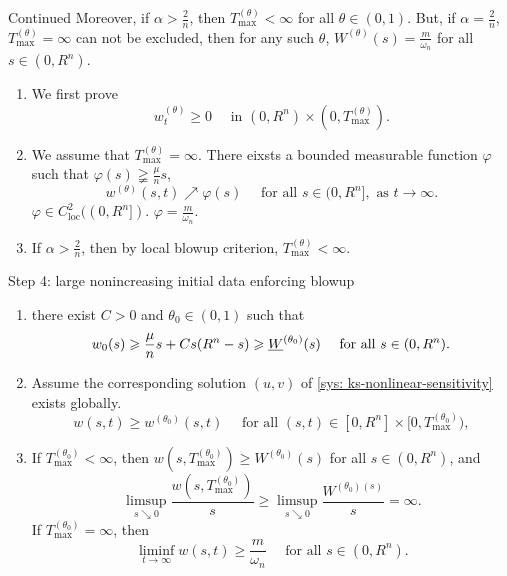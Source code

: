 \begin{frame}
\begin{block}{Continued}
Moreover, if $\alpha > \frac2n$, then $T_{\max}^{(\theta)} < \infty$ for all $\theta\in(0,1)$. But, if $\alpha = \frac2n$, $T_{\max}^{(\theta)} = \infty$ can not be excluded, then for any such $\theta$, $W^{(\theta)}(s) = \frac{m}{\omega_n}$ for all $s\in(0, R^n)$.
\end{block}
\begin{enumerate}
  \item 	We first prove
	\begin{equation}
		\label{wtgeq0}
		w_t^{(\theta)}\geqslant0 \quad\text{ in } (0, R^n)\times(0, T_{\max}^{(\theta)}).
	\end{equation}
  \item We assume that $T_{\max}^{(\theta)} = \infty$. There eixsts a bounded measurable function $\varphi$ such that $\varphi(s)\gneqq\frac{\mu}{n}s$, 
      $$w^{(\theta)}(s, t) \nearrow \varphi(s) \quad\text{ for all } s\in(0, R^n], \text{ as }t\to\infty.$$ $\varphi\in C^{2}_{\mathrm{loc}}((0,R^n])$. $\varphi=\frac{m}{\omega_n}$.
  \item  If $\alpha>\frac2n$, then by local blowup criterion, $T_{\max}^{(\theta)} < \infty$.
\end{enumerate}
\end{frame}

\begin{frame}{Step 4: large nonincreasing initial data enforcing blowup}
\begin{enumerate}
  \item there exist $C > 0$ and $\theta_0\in(0,1)$ such that
\begin{equation}\nonumber
			w_0(s) \geqslant \frac{\mu}{n}s + Cs(R^n - s)\geqslant \underline{W}^{(\theta_0)}(s) \quad \text{ for  all } s\in (0, R^n).
\end{equation}
  \item Assume the corresponding solution $(u, v)$ of \eqref{sys: ks-nonlinear-sensitivity} exists globally.
  \begin{equation*}
	w(s, t) \geqslant w^{(\theta_0)}(s, t) \quad \text{ for all } (s, t)\in[0, R^n]\times[0, T_{\max}^{(\theta_0)}),
\end{equation*}
  \item If $T_{\max}^{(\theta_0)} < \infty$, then $w(s, T_{\max}^{(\theta_0)}) \geqslant W^{(\theta_0)}(s)$ for all $s\in(0, R^n)$, 
and 
\begin{equation*}
	\limsup_{s\searrow0}\frac{w(s, T_{\max}^{(\theta_0)})}{s} \geqslant \limsup_{s\searrow0}\frac{W^{(\theta_0)(s)}}{s} = \infty.
\end{equation*}
If $T_{\max}^{(\theta_0)} = \infty$, then
\begin{equation*}
	\liminf_{t\to\infty}w(s, t) \geqslant \frac{m}{\omega_n}\quad\text{ for all } s\in (0, R^n).
\end{equation*}
\end{enumerate}
\end{frame}

